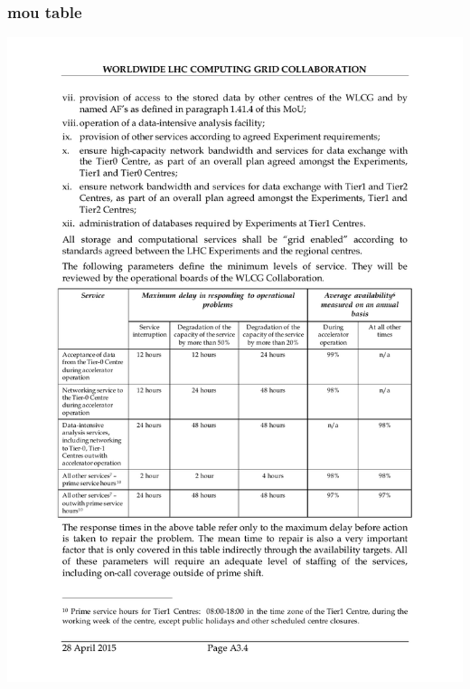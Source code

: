 \documentclass{beamer}
\begin{document}
\begin{frame}
  \frametitle{mou table}
  \includegraphics[scale=0.5, trim={1cm 7cm 1cm 11cm},clip]{mou_page25.pdf}
\end{frame}
\end{document}
